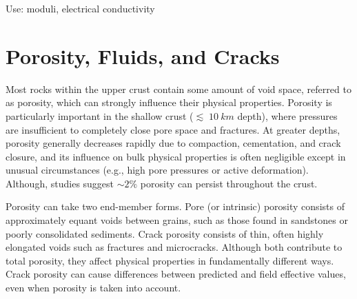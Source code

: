 Use: moduli, electrical conductivity


%



\section{Porosity, Fluids, and Cracks}\label{sec:porosity}

Most rocks within the upper crust contain some amount of void space, referred to as porosity, which can strongly influence their physical properties. Porosity is particularly important in the shallow crust ($\lesssim\;\SI{10}{km}$ depth), where pressures are insufficient to completely close pore space and fractures. At greater depths, porosity generally decreases rapidly due to compaction, cementation, and crack closure, and its influence on bulk physical properties is often negligible except in unusual circumstances (e.g., high pore pressures or active deformation). Although, studies suggest $\sim2\%$ porosity can persist throughout the crust.

Porosity can take two end-member forms. Pore (or intrinsic) porosity consists of approximately equant voids between grains, such as those found in sandstones or poorly consolidated sediments. Crack porosity consists of thin, often highly elongated voids such as fractures and microcracks. Although both contribute to total porosity, they affect physical properties in fundamentally different ways. Crack porosity can cause differences between predicted and field effective values, even when porosity is taken into account. 


